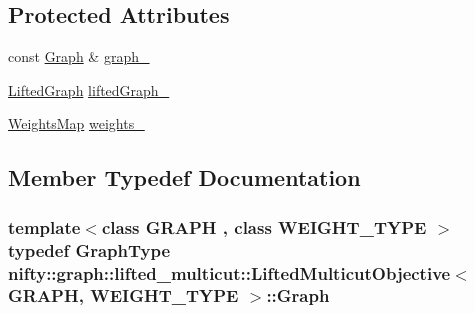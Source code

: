 \subsection*{Protected Attributes}
\begin{DoxyCompactItemize}
\item 
const \hyperlink{classnifty_1_1graph_1_1lifted__multicut_1_1LiftedMulticutObjective_a09c1023d4317152e280bb5e0ede7e4a9}{Graph} \& \hyperlink{classnifty_1_1graph_1_1lifted__multicut_1_1LiftedMulticutObjective_ab1930a04106c5799217149a300d5b2d0}{graph\+\_\+}
\item 
\hyperlink{classnifty_1_1graph_1_1lifted__multicut_1_1LiftedMulticutObjective_a3e047dd820c11fb2df428de46d7a5cab}{Lifted\+Graph} \hyperlink{classnifty_1_1graph_1_1lifted__multicut_1_1LiftedMulticutObjective_af85f97b9b52b3aa6b71eb8bcccb10b73}{lifted\+Graph\+\_\+}
\item 
\hyperlink{classnifty_1_1graph_1_1lifted__multicut_1_1LiftedMulticutObjective_a2063225a63332d8a74f82fef80f09d0b}{Weights\+Map} \hyperlink{classnifty_1_1graph_1_1lifted__multicut_1_1LiftedMulticutObjective_a5ecacadccb40e38448a927a059f3d15e}{weights\+\_\+}
\end{DoxyCompactItemize}


\subsection{Member Typedef Documentation}
\hypertarget{classnifty_1_1graph_1_1lifted__multicut_1_1LiftedMulticutObjective_a09c1023d4317152e280bb5e0ede7e4a9}{}
\subsubsection[{Graph}]{\setlength{\rightskip}{0pt plus 5cm}template$<$class G\+R\+A\+P\+H , class W\+E\+I\+G\+H\+T\+\_\+\+T\+Y\+P\+E $>$ typedef {\bf Graph\+Type} {\bf nifty\+::graph\+::lifted\+\_\+multicut\+::\+Lifted\+Multicut\+Objective}$<$ G\+R\+A\+P\+H, W\+E\+I\+G\+H\+T\+\_\+\+T\+Y\+P\+E $>$\+::{\bf Graph}}\label{classnifty_1_1graph_1_1lifted__multicut_1_1LiftedMulticutObjective_a09c1023d4317152e280bb5e0ede7e4a9}
\hypertarget{classnifty_1_1graph_1_1lifted__multicut_1_1LiftedMulticutObjective_a1b5ca1bdd020702b0ad4ca4ed771d436}{}
